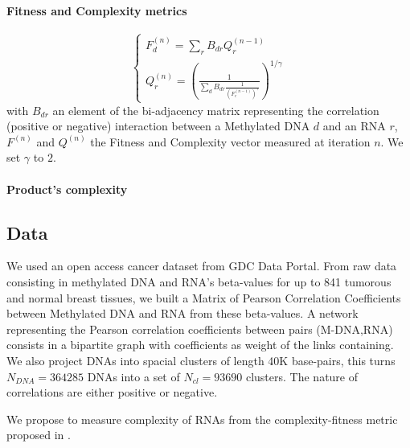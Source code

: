 \documentclass[10pt,a4paper]{article}
\begin{document}
\paragraph{Fitness and Complexity metrics}
\begin{equation}
\left\{
\begin{matrix}
F^{(n)}_{d} =  \sum_{r} B_{dr}Q^{(n-1)}_{r}\\
Q^{(n)}_{r} =  (\frac{1}{\sum_{d}B_{dr}\frac{1}{(F^{(n-1)}_{c})^{\gamma}}})^{1/\gamma}
\end{matrix}
\right.
\end{equation}
with $B_{dr}$ an element of the bi-adjacency matrix representing the correlation (positive or negative) interaction between a Methylated DNA $d$ and an RNA $r$, $F^{(n)}$ and $Q^{(n)}$ the Fitness and Complexity vector measured at iteration $n$. We set $\gamma$ to $2$.
\paragraph{Product's complexity}
\subsection{Data}
We used an open access cancer dataset from GDC Data Portal. From raw data consisting in methylated DNA and RNA's beta-values for up to 841 tumorous and normal breast tissues, we built a Matrix of Pearson Correlation Coefficients between Methylated DNA and RNA from these beta-values. A network representing the Pearson correlation coefficients between pairs (M-DNA,RNA) consists in a bipartite graph with coefficients as weight of the links containing. We also project DNAs into spacial clusters of length 40K base-pairs, this turns $N_{DNA} = 364285$ DNAs into a set of $N_{cl} = 93690$ clusters. The nature of correlations are either positive or negative.

We propose to measure complexity of RNAs from the complexity-fitness metric proposed in \cite{tacchella12}.
\end{document}
